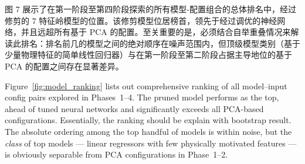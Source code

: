 图 7 展示了在第一阶段至第四阶段探索的所有模型-配置组合的总体排名中，经过修剪的 7 特征岭模型的位置。该修剪模型位居榜首，领先于经过调优的神经网络，并且远超所有基于 PCA 的配置。至关重要的是，必须结合自举重叠情况来解读此排名：排名前几的模型之间的绝对顺序在噪声范围内，但顶级模型类别（基于少量物理特征的简单线性回归器）与在第一阶段至第二阶段占据主导地位的基于 PCA 的配置之间存在显著差异。

Figure~\ref{fig:model_ranking} lists out comprehensive ranking of all model--input config pairs explored in Phases~1--4. The pruned model performs as the top, ahead of tuned neural networks and significantly exceeds all PCA-based configurations. Essentially, the ranking should be explain with bootstrap result. The absolute ordering among the top handful of models is within noise, but the \emph{class} of top models --- linear regressors with few physically motivated features --- is obviously separable from PCA configurations in Phase~1--2. 




















